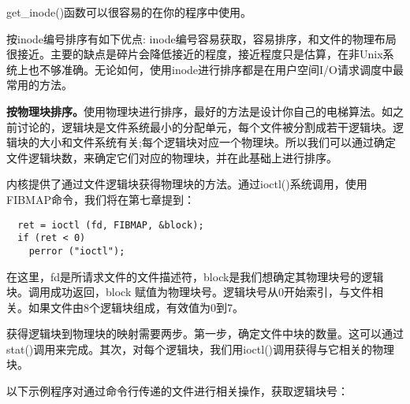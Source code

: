 get\_inode()函数可以很容易的在你的程序中使用。

按inode编号排序有如下优点: inode编号容易获取，容易排序，和文件的物理布局很接近。主要的缺点是碎片会降低接近的程度，接近程度只是估算，在非Unix系统上也不够准确。无论如何，使用inode进行排序都是在用户空间I/O请求调度中最常用的方法。

\textbf{按物理块排序。}使用物理块进行排序，最好的方法是设计你自己的电梯算法。如之前讨论的，逻辑块是文件系统最小的分配单元，每个文件被分割成若干逻辑块。逻辑块的大小和文件系统有关;每个逻辑块对应一个物理块。所以我们可以通过确定文件逻辑块数，来确定它们对应的物理块，并在此基础上进行排序。

内核提供了通过文件逻辑块获得物理块的方法。通过ioctl()系统调用，使用FIBMAP命令，我们将在第七章提到：

\begin{lstlisting}
  ret = ioctl (fd, FIBMAP, &block);
  if (ret < 0)
    perror ("ioctl");
\end{lstlisting}

在这里，fd是所请求文件的文件描述符，block是我们想确定其物理块号的逻辑块。调用成功返回，block 赋值为物理块号。逻辑块号从0开始索引，与文件相关。如果文件由8个逻辑块组成，有效值为0到7。

获得逻辑块到物理块的映射需要两步。第一步，确定文件中块的数量。这可以通过stat()调用来完成。其次，对每个逻辑块，我们用ioctl()调用获得与它相关的物理块。

以下示例程序对通过命令行传递的文件进行相关操作，获取逻辑块号：

